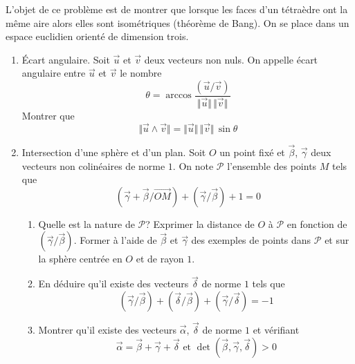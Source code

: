L'objet de ce problème est de montrer que lorsque les faces d'un tétraèdre ont la même aire alors elles sont isométriques (théorème de Bang).\newline
On se place dans un espace euclidien orienté de dimension trois.
\begin{enumerate}
 \item \'Ecart angulaire.\newline
Soit $\overrightarrow{u}$ et $\overrightarrow{v}$ deux vecteurs non nuls. On appelle écart angulaire entre $\overrightarrow{u}$ et $\overrightarrow{v}$ le nombre
\begin{displaymath}
 \theta = \arccos \frac{(\overrightarrow{u}/\overrightarrow{v})}{\Vert\overrightarrow{u}\Vert\, \Vert\overrightarrow{v}\Vert}
\end{displaymath}
Montrer que 
\begin{displaymath}
 \Vert \overrightarrow{u}\wedge\overrightarrow{v}\Vert = \Vert\overrightarrow{u}\Vert\, \Vert\overrightarrow{v}\Vert\,\sin\theta
\end{displaymath}

 \item Intersection d'une sphère et d'un plan.\newline
Soit $O$ un point fixé et $\overrightarrow{\beta}$, $\overrightarrow{\gamma}$ deux vecteurs non colinéaires de norme $1$. On note $\mathcal{P}$ l'ensemble des points $M$ tels que 
\begin{displaymath}
 (\overrightarrow{\gamma}+\overrightarrow{\beta}/\overrightarrow{OM})+ (\overrightarrow{\gamma}/\overrightarrow{\beta})+1 = 0
\end{displaymath}
\begin{enumerate}
 \item Quelle est la nature de $\mathcal{P}$? Exprimer la distance de $O$ à $\mathcal{P}$ en fonction de $(\overrightarrow{\gamma}/\overrightarrow{\beta})$. Former à l'aide de $\overrightarrow \beta$ et $\overrightarrow \gamma$ des exemples de points dans $\mathcal{P}$ et sur la sphère centrée en $O$ et de rayon $1$.
 \item En déduire qu'il existe des vecteurs $\overrightarrow{\delta}$ de norme $1$ tels que
\begin{displaymath}
 (\overrightarrow{\gamma}/\overrightarrow{\beta}) +(\overrightarrow{\delta}/\overrightarrow{\beta}) +(\overrightarrow{\gamma}/\overrightarrow{\delta}) = -1
\end{displaymath}

\item Montrer qu'il existe des vecteurs $\overrightarrow{\alpha}$, $\overrightarrow{\delta}$ de norme $1$ et vérifiant
\begin{displaymath}
 \overrightarrow \alpha = \overrightarrow \beta + \overrightarrow \gamma + \overrightarrow \delta 
\text{ et }
\det(\overrightarrow{\beta},\overrightarrow{\gamma},\overrightarrow{\delta}) > 0
\end{displaymath}
\end{enumerate}


\end{enumerate}
